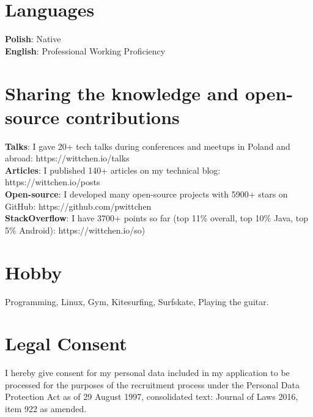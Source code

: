 \documentclass[letterpaper,11pt]{article}
\begin{document}
\section{Languages}
 \begin{itemize}[leftmargin=0.15in, label={}]
    \small{\item{
     \textbf{Polish}{: Native} \\
     \textbf{English}{: Professional Working Proficiency} \\
    }}
 \end{itemize}

\section{Sharing the knowledge and open-source contributions}
 \begin{itemize}[leftmargin=0.15in, label={}]
    \small{\item{
     \textbf{Talks}{: I gave 20+ tech talks during conferences and meetups in Poland and abroad: https://wittchen.io/talks} \\
     \textbf{Articles}{: I published 140+ articles on my technical blog: https://wittchen.io/posts} \\
     \textbf{Open-source}{: I developed many open-source projects with 5900+ stars on GitHub: https://github.com/pwittchen} \\
     \textbf{StackOverflow}{: I have 3700+ points so far (top 11\% overall, top 10\% Java, top 5\% Android): https://wittchen.io/so)}
    }}
 \end{itemize}

\section{Hobby}
 \begin{itemize}[leftmargin=0.15in, label={}]
    \small{\item{
     Programming, Linux, Gym, Kitesurfing, Surfskate, Playing the guitar.\\
    }}
 \end{itemize}

\section{Legal Consent}
 \begin{itemize}[leftmargin=0.15in, label={}]
    \small{\item{
    I hereby give consent for my personal data included in my application
    to be processed for the purposes of the recruitment process
    under the Personal Data Protection Act as of 29 August 1997,
    consolidated text: Journal of Laws 2016, item 922 as amended. \\
    }}
 \end{itemize}

\end{document}
